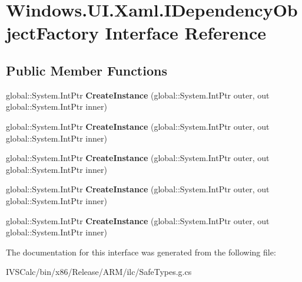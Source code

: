 \hypertarget{interface_windows_1_1_u_i_1_1_xaml_1_1_i_dependency_object_factory}{}\section{Windows.\+U\+I.\+Xaml.\+I\+Dependency\+Object\+Factory Interface Reference}
\label{interface_windows_1_1_u_i_1_1_xaml_1_1_i_dependency_object_factory}
\subsection*{Public Member Functions}
\begin{DoxyCompactItemize}
\item 
\mbox{\label{interface_windows_1_1_u_i_1_1_xaml_1_1_i_dependency_object_factory_a032b0c9276752eaf211767530de2a19a}} 
global\+::\+System.\+Int\+Ptr {\bfseries Create\+Instance} (global\+::\+System.\+Int\+Ptr outer, out global\+::\+System.\+Int\+Ptr inner)
\item 
\mbox{\label{interface_windows_1_1_u_i_1_1_xaml_1_1_i_dependency_object_factory_a032b0c9276752eaf211767530de2a19a}} 
global\+::\+System.\+Int\+Ptr {\bfseries Create\+Instance} (global\+::\+System.\+Int\+Ptr outer, out global\+::\+System.\+Int\+Ptr inner)
\item 
\mbox{\label{interface_windows_1_1_u_i_1_1_xaml_1_1_i_dependency_object_factory_a032b0c9276752eaf211767530de2a19a}} 
global\+::\+System.\+Int\+Ptr {\bfseries Create\+Instance} (global\+::\+System.\+Int\+Ptr outer, out global\+::\+System.\+Int\+Ptr inner)
\item 
\mbox{\label{interface_windows_1_1_u_i_1_1_xaml_1_1_i_dependency_object_factory_a032b0c9276752eaf211767530de2a19a}} 
global\+::\+System.\+Int\+Ptr {\bfseries Create\+Instance} (global\+::\+System.\+Int\+Ptr outer, out global\+::\+System.\+Int\+Ptr inner)
\item 
\mbox{\label{interface_windows_1_1_u_i_1_1_xaml_1_1_i_dependency_object_factory_a032b0c9276752eaf211767530de2a19a}} 
global\+::\+System.\+Int\+Ptr {\bfseries Create\+Instance} (global\+::\+System.\+Int\+Ptr outer, out global\+::\+System.\+Int\+Ptr inner)
\end{DoxyCompactItemize}


The documentation for this interface was generated from the following file\+:\begin{DoxyCompactItemize}
\item 
I\+V\+S\+Calc/bin/x86/\+Release/\+A\+R\+M/ilc/Safe\+Types.\+g.\+cs\end{DoxyCompactItemize}
